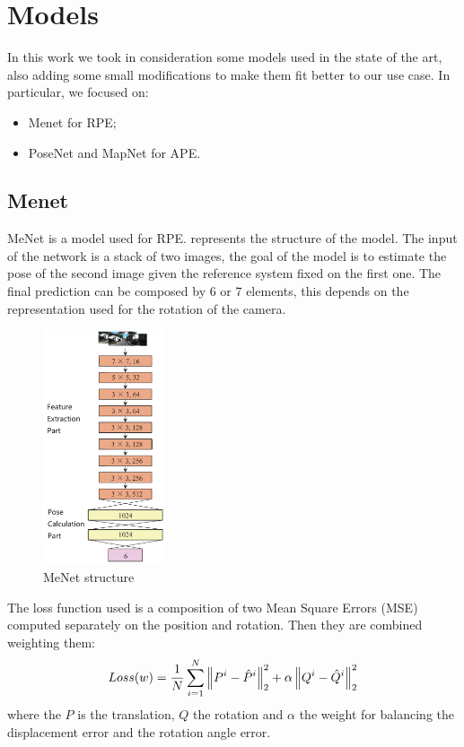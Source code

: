 \section{Models}
In this work we took in consideration some models used in the state of the art, also adding some small modifications to make them fit better to our use case.
In particular, we focused on:
\begin{itemize}
    \item Menet for RPE;
    \item PoseNet and MapNet for APE.
\end{itemize}

\subsection{Menet}
MeNet is a model used for RPE.  represents the structure of the model. The input of the network is a stack of two images, the goal of the model is to estimate the pose of the second image given the reference system fixed on the first one. The final prediction can be composed by 6 or 7 elements, this depends on the representation used for the rotation of the camera.
\begin{figure}
    \begin{center}
        \includegraphics[width=0.32\textwidth]{./imgs/menet_structure.png}
    \end{center}
    \caption{MeNet structure}
    \label{fig:menet-structure}
\end{figure}

The loss function used is a composition of two Mean Square Errors (MSE) computed separately on the position and rotation. Then they are combined weighting them:
\begin{equation}
    Loss(w) = \frac{1}{N} \sum\limits_{i=1}^N \norm{P^i - \hat{P}^i}^2_2 + \alpha\norm{Q^i - \hat{Q}^i}^2_2
    \label{eq:menet-loss}
\end{equation}
where the $P$ is the translation, $Q$ the rotation and $\alpha$ the weight for balancing the displacement error and the rotation angle error.

